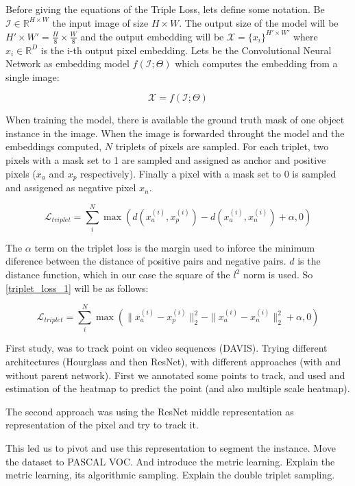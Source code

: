 Before giving the equations of the Triple Loss, lets define some notation.
Be $\mathcal{I} \in \mathbb{R}^{H \times W}$ the input image of size $H \times W$.
The output size of the model will be $H' \times W' = \frac{H}{8} \times \frac{W}{8}$ and the output embedding will be $\mathcal{X} = \{x_i\}^{H' \times W'}$ where $x_i \in \mathbb{R}^D$ is the i-th output pixel embedding.
Lets be the Convolutional Neural Network as embedding model $f(\mathcal{I}; \Theta)$ which computes the embedding from a single image:

\begin{equation}
  \mathcal{X} = f(\mathcal{I}; \Theta)
\end{equation}

When training the model, there is available the ground truth mask of one object instance in the image. When the image is forwarded throught the model and the embeddings computed, $N$ triplets of pixels are sampled. For each triplet, two pixels with a mask set to 1 are sampled and assigned as anchor and positive pixels ($x_a$ and $x_p$ respectively). Finally a pixel with a mask set to 0 is sampled and assigened as negative pixel $x_n$.

\begin{equation}
  \label{eq:triplet_loss_1}
  \mathcal{L}_{triplet} = \sum_i^N \max \left( d(x_a^{(i)}, x_p^{(i)}) - d(x_a^{(i)}, x_n^{(i)})  + \alpha, 0 \right)
\end{equation}

The $\alpha$ term on the triplet loss is the margin used to inforce the minimum diference between the distance of positive pairs and negative pairs. $d$ is the distance function, which in our case the square of the $l^2$ norm is used. So \eqref{triplet_loss_1} will be as follows:

\begin{equation}
  \label{eq:triplet_loss_2}
  \mathcal{L}_{triplet} =
	\sum_i^N \max \left(
		\|x_a^{(i)} - x_p^{(i)}\|^2_2 - \|x_a^{(i)} - x_n^{(i)}\|_2^2  + \alpha,
		0 \right)
\end{equation}








First study, was to track point on video sequences (DAVIS). Trying different architectures (Hourglass and then ResNet), with different approaches (with and without parent network). First we annotated some points to track, and used and estimation of the heatmap to predict the point (and also multiple scale heatmap).

The second approach was using the ResNet middle representation as representation of the pixel and try to track it.

This led us to pivot and use this representation to segment the instance.
Move the dataset to PASCAL VOC. And introduce the metric learning. Explain the metric learning, its algorithmic sampling. Explain the double triplet sampling.
